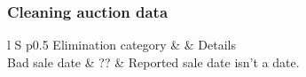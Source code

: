 \documentclass[11pt,letterpaper,oneside]{article}
\newcommand{\snippet}[1]{\hspace{-0.15em}}
\begin{document}


\subsubsection{Cleaning auction data}
\label{sec:manheim-data-cleaning}

\begin{table}[hbtp]
    \caption{Cleaning Manheim auction data}
    \label{tab:cleaning_manheim}

\begin{tabular}{l S p{0.5\linewidth}}
    \toprule
	Elimination category &  & Details\\
	\midrule
	Bad sale date & ?? & Reported sale date isn't a date.\\
	\addlinespace


\end{tabular}
\end{table}
\end{document}
